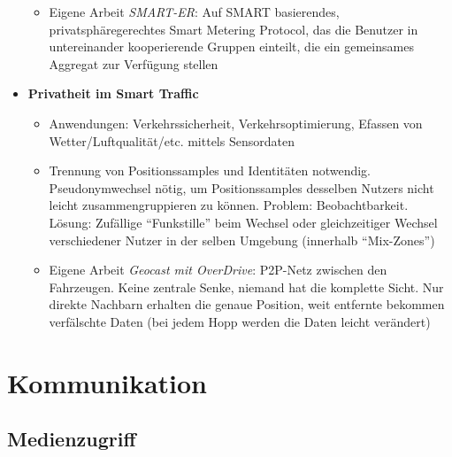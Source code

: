 \begin{itemize}
\begin{itemize}
\begin{itemize}
		\end{itemize}
		\item Eigene Arbeit \textit{SMART-ER}: Auf SMART basierendes, privatsphäregerechtes Smart Metering Protocol, das die Benutzer in untereinander kooperierende Gruppen einteilt, die ein gemeinsames Aggregat zur Verfügung stellen
	\end{itemize}
	\item \textbf{Privatheit im Smart Traffic}
	\begin{itemize}
		\item Anwendungen: Verkehrssicherheit, Verkehrsoptimierung, Efassen von Wetter/Luftqualität/etc. mittels Sensordaten
		\item Trennung von Positionssamples und Identitäten notwendig. Pseudonymwechsel nötig, um Positionssamples desselben Nutzers nicht leicht zusammengruppieren zu können. Problem: Beobachtbarkeit. Lösung: Zufällige "`Funkstille"' beim Wechsel oder gleichzeitiger Wechsel verschiedener Nutzer in der selben Umgebung (innerhalb "`Mix-Zones"')
		\item Eigene Arbeit \textit{Geocast mit OverDrive}: P2P-Netz zwischen den Fahrzeugen. Keine zentrale Senke, niemand hat die komplette Sicht. Nur direkte Nachbarn erhalten die genaue Position, weit entfernte bekommen verfälschte Daten (bei jedem Hopp werden die Daten leicht verändert)
	\end{itemize}
\end{itemize}



\section{Kommunikation}

\subsection{Medienzugriff}

